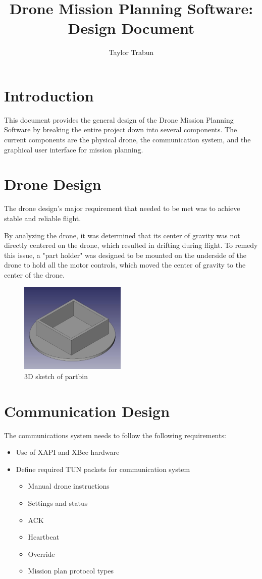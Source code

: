 \documentclass[12pt,a4paper]{article}
\author{Taylor Trabun}
\title{Drone Mission Planning Software: Design Document}
\begin{document}
\maketitle

\section{Introduction}
This document provides the general design of the Drone Mission Planning Software by breaking the entire project down into several components. The current components are the physical drone, the communication system, and the graphical user interface for mission planning.

\section{Drone Design}
The drone design's major requirement that needed to be met was to achieve stable and reliable flight. 

By analyzing the drone, it was determined that its center of gravity was not directly centered on the drone, which resulted in drifting during flight. To remedy this issue, a "part holder" was designed to be mounted on the underside of the drone to hold all the motor controls, which moved the center of gravity to the center of the drone. 

\begin{figure}[h!]

  \centering
    \includegraphics[width=0.45\textwidth]{partbin.jpg}
   \caption{3D sketch of partbin}
\end{figure}


\section{Communication Design}
The communications system needs to follow the following requirements:
\begin{itemize}
	\item Use of XAPI and XBee hardware
	\item Define required TUN packets for communication system 
	\begin{itemize}
		\item Manual drone instructions
		\item Settings and status
		\item ACK
		\item Heartbeat
		\item Override
		\item Mission plan protocol types
	\end{itemize}
\end{itemize}
\end{document}
